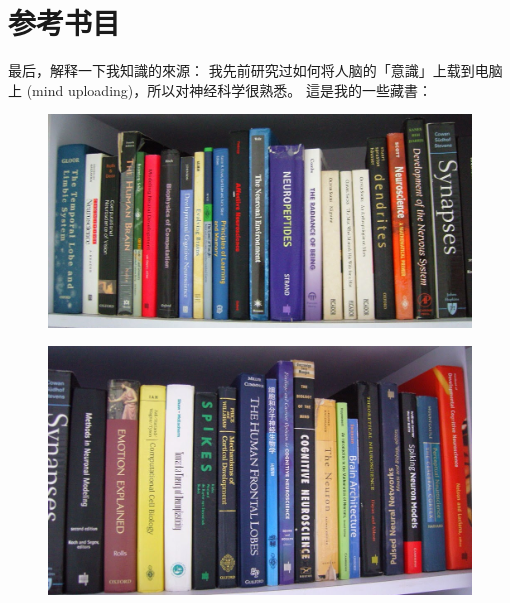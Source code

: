 \documentclass[12pt]{report}
\newcommand{\cc}[2]{#1}
\newcommand{\cc}[2]{#2}
\begin{document}
{\section{\cc{参考书目}{References}}

\cc{
最后，解释一下我知識的來源： 我先前研究过如何将人脑的「意識」上载到电脑上 (mind uploading)，所以对神经科学很熟悉。 這是我的一些藏書：
}{
Lastly, let me explain the sources of my knowledge:  I was fascinated by the idea of uploading the human brain's ``consciousness'' to the computer (``mind uploading''), so I started to study biochemistry at university and did a lot of studying on neuroscience.  These are some of the books that I've bought during that period (there were also a few boxes of journal papers):
}

\begin{figure}[H]
\centering
\includegraphics[scale=0.5]{neuro-books1.jpg}
\end{figure}

\begin{figure}[H]
\centering
\includegraphics[scale=0.5]{neuro-books2.jpg}
\end{figure}

}
\end{document}
